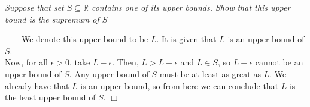 \documentclass[
]{article}
\begin{document}
\emph{Suppose that set \(S \subseteq \mathbb{R}\) contains one of its
upper bounds. Show that this upper bound is the supremum of \(S\)}

~~~~We denote this upper bound to be \(L\). It is given that \(L\) is an
upper bound of \(S\).\\
\hspace*{0.333em}\hspace*{0.333em}\hspace*{0.333em}\hspace*{0.333em}Now,
for all \(\epsilon > 0\), take \(L - \epsilon\). Then,
\(L > L - \epsilon\) and \(L \in S\), so \(L - \epsilon\) cannot be an
upper bound of \(S\). Any upper bound of \(S\) must be at least as great
as \(L\). We already have that \(L\) is an upper bound, so from here we
can conclude that \(L\) is the least upper bound of \(S\).
\hfill \(\Box\)
\end{document}
